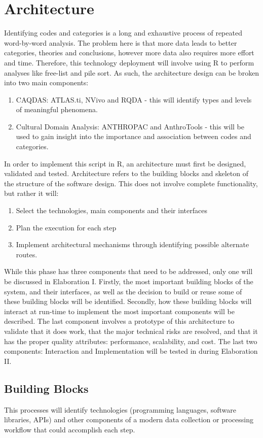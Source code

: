 \documentclass{article}
\begin{document}
\section{Architecture}
Identifying codes and categories is a long and exhaustive process of repeated word-by-word analysis. The problem here is that more data leads to better categories, theories and conclusions, however more data also requires more effort and time. Therefore, this technology deployment will involve using R to perform analyses like free-list and pile sort. As such, the architecture design can be broken into two main components:
\begin{enumerate}
\item CAQDAS: ATLAS.ti, NVivo and RQDA -  this will identify types and levels of meaningful phenomena.
\item Cultural Domain Analysis: ANTHROPAC and AnthroTools -  this will be used to gain insight into the importance and association between codes and categories.
\end{enumerate}
In order to implement this script in R, an architecture must first be designed, validated and tested. Architecture refers to the building blocks and skeleton of the structure of the software design. This does not involve complete functionality, but rather it will:
\begin{enumerate}
    \item Select the technologies, main components and their interfaces
    \item Plan the execution for each step
    \item Implement architectural mechanisms through identifying possible alternate routes.
\end{enumerate}
While this phase has three components that need to be addressed, only one will be discussed in Elaboration I. Firstly, the most important building blocks of the system, and their interfaces, as well as the decision to build or reuse some of these building blocks will be identified. Secondly, how these building blocks will interact at run-time to implement the most important components will be described. The last component involves a prototype of this architecture to validate that it does work, that the major technical risks are resolved, and that it has the proper quality attributes: performance, scalability, and cost. The last two components: Interaction and Implementation will be tested in during Elaboration II.

\subsection{Building Blocks}
This processes will identify technologies (programming languages, software libraries, APIs) and other components of a modern data collection or processing workflow that could accomplish each step.
\end{document}
